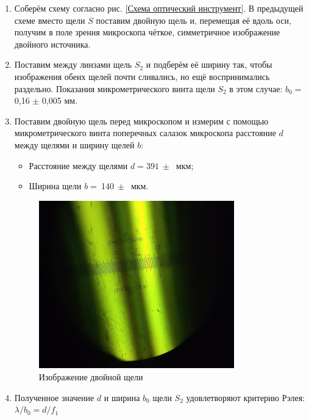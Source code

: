 \documentclass[a4paper, 12pt]{article}
\begin{document}
\begin{enumerate}
	\item Соберём схему согласно рис. \ref{Схема оптический инструмент}. В предыдущей схеме вместо щели $S$ поставим двойную щель и, перемещая её вдоль оси, получим в поле зрения микроскопа чёткое, симметричное изображение двойного источника.

	\item Поставим между линзами щель $S_2$ и подберём её ширину так, чтобы изображения обеих щелей почти сливались, но ещё воспринимались раздельно. Показания микрометрического винта щели $S_2$ в этом случае: $b_0 = ~$0,16 $\pm$ 0,005 мм.

	\item Поставим двойную щель перед микроскопом и измерим с помощью микрометрического винта поперечных салазок микроскопа расстояние $d$ между щелями и ширину щелей $b$:

	\begin{itemize}
		\item Расстояние между щелями $d = 391~\pm~$ мкм;
		\item Ширина щели $b =~$140$~\pm~$ мкм.
	\end{itemize}

\clearpage
	\begin{figure}[h!]
		\centering
		\includegraphics[width=0.8\textwidth]{Dual_source.jpg}
		\caption{Изображение двойной щели}
	\end{figure}

	\item Полученное значение $d$ и ширина $b_0$ щели $S_2$ удовлетворяют критерию Рэлея: $\lambda/b_0 = d/f_1$

\end{enumerate}
\end{document}
